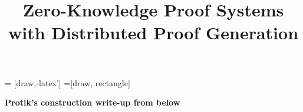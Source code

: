 \documentclass[runningheads]{llncs}
\title{Zero-Knowledge Proof Systems with Distributed Proof Generation}
\begin{document}
\maketitle

 = [draw,-latex']
=[draw, rectangle]



















\textbf{Protik's construction write-up from below}








	
\end{document}
